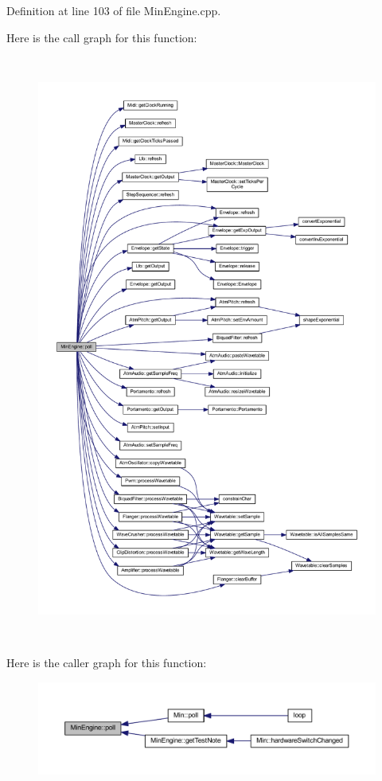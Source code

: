 Definition at line 103 of file Min\+Engine.\+cpp.

Here is the call graph for this function\+:
\nopagebreak
\begin{figure}[H]
\begin{center}
\leavevmode
\includegraphics[height=550pt]{class_min_engine_af0b91eca44954cb677808c3d24659596_cgraph}
\end{center}
\end{figure}
Here is the caller graph for this function\+:
\nopagebreak
\begin{figure}[H]
\begin{center}
\leavevmode
\includegraphics[width=350pt]{class_min_engine_af0b91eca44954cb677808c3d24659596_icgraph}
\end{center}
\end{figure}
\mbox{\label{class_min_engine_ac76abe71fbd84b163b68fc7b12fb1a26}} 
